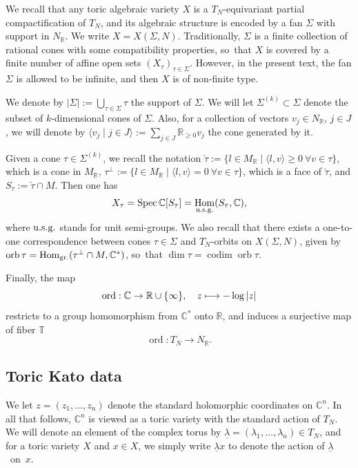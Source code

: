 \documentclass[JEP,XML,SOM,Unicode,NoFloatCountersInSection]{cedram}
\theoremstyle{definition}
\DeclareMathOperator{\codim}{codim}
\newcommand\mto{\mathchoice{\longmapsto}{\mapsto}{\mapsto}{\mapsto}}
\let\la\lambda
\let\un\underline
\newcommand{\CC}{\mathbb{C}}
\newcommand{\RR}{\mathbb{R}}
\newcommand{\TT}{\mathbb{T}}
\DeclareMathOperator{\Hom}{Hom}
\DeclareMathOperator{\orb}{orb}
\DeclareMathOperator{\ord}{ord}
\DeclareMathOperator{\Spec}{Spec}
\begin{document}
We recall that any toric algebraic variety $X$ is a $T_N$-equivariant partial compactification of $T_N$, and its algebraic structure is encoded by a fan $\Sigma$ with support in $N_\RR$. We write $X=X(\Sigma,N)$. Traditionally, $\Sigma$ is a finite collection of rational cones with some compatibility properties, so~that $X$ is covered by a finite number of affine open sets $(X_\tau)_{\tau\in\Sigma}$. However, in the present text, the fan $\Sigma$ is allowed to be infinite, and then $X$ is of non-finite type.

We denote by $|\Sigma|:=\bigcup_{\tau\in\Sigma}\tau$ the support of $\Sigma$. We will let $\Sigma^{(k)}\subset\Sigma$ denote the subset of $k$-dimensional cones of $\Sigma$. Also, for a collection of vectors $v_j\in N_\RR$, $j\in J$, we will denote by $\langle v_j\mid j\in J\rangle:=\sum_{j\in J}\RR_{\geq 0}v_j$ the cone generated by it.

Given a cone $\tau\in\Sigma^{(k)}$, we recall the notation $\check\tau:=\{l\in M_\RR\mid \langle l,v\rangle\geq 0\ \forall v\in\tau\}$, which is a cone in $M_\RR$, $\tau^\perp:=\{l\in M_\RR\mid \langle l,v\rangle=0\ \forall v\in\tau\}$, which is a face of $\check\tau$, and $S_\tau:=\check\tau\cap M$. Then one has
\begin{equation*}
X_\tau=\Spec\CC[S_\tau]=\Hom_{\textup{u.s.g.}}(S_\tau,\CC),
\end{equation*}
where $\textup{u.s.g.}$ stands for unit semi-groups. We also recall \cite[Th.\,4.2]{oda} that there exists a one-to-one correspondence between cones $\tau\in\Sigma$ and $T_N$-orbits on $X(\Sigma,N)$, given by $\orb\tau=\Hom_{\textup{gr.}}(\tau^{\perp}\cap M,\CC^*)$, so~that $\dim\tau=\codim\orb\tau$.

Finally, the map
\begin{equation*}
\ord: \CC\to \RR\cup\{\infty\}, \quad z\mto -\log|z|
\end{equation*}
restricts to a group homomorphism from $\CC^*$ onto $\RR$, and induces a surjective map of fiber $\TT$
\begin{equation*}
\ord:T_N\to N_\RR.
\end{equation*}

\subsection{Toric Kato data}
We let $z=(z_1,\ldots, z_n)$ denote the standard holomorphic coordinates on $\CC^n$. In all that follows, $\CC^n$ is viewed as a toric variety with the standard action of $T_N$. We will denote an element of the complex torus by \hbox{$\un \lambda\!=\!(\la_1,\ldots,\la_n)\!\in\!T_N$}, and for a toric variety $X$ and $x\!\in\!X$, we simply write $\un\la x$ to denote the action of $\un\la$~on~$x$.
\end{document}
